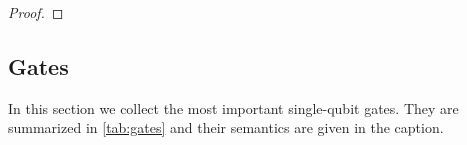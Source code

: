 \begin{proof}
		\end{proof}

		\subsection{Gates}
			In this section we collect the most important single-qubit gates. They are summarized in \autoref{tab:gates} and their semantics are given in the caption.

